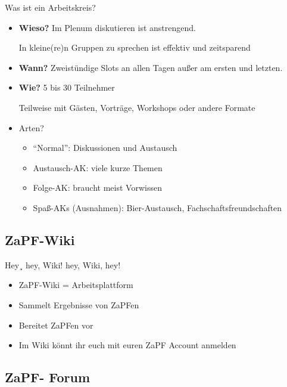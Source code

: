 \documentclass[compress,]{beamer}
\begin{document}
\begin{frame}{Was ist ein Arbeitskreis?}

  \begin{itemize}[<+->]
  \item \textbf{Wieso?} Im Plenum diskutieren ist anstrengend.

    In kleine(re)n Gruppen zu sprechen ist effektiv und zeitsparend
  \item \textbf{Wann?} Zweistündige Slots an allen Tagen außer am ersten und letzten.
  \item \textbf{Wie?} 5 bis 30 Teilnehmer

    Teilweise mit Gästen, Vorträge, Workshops oder andere Formate
  \item Arten?
    \begin{itemize}[<+->]
    \item ``Normal'': Diskussionen und Austausch
    \item Austausch-AK: viele kurze Themen
    \item Folge-AK: braucht meist Vorwissen
    \item Spaß-AKs (Ausnahmen): Bier-Austausch, Fachschaftsfreundschaften
    \end{itemize}
  \end{itemize}

\end{frame}


\subsection{ZaPF-Wiki}

\begin{frame}{Hey¸ hey, Wiki! hey, Wiki, hey!}

\begin{itemize}[<+->]
	\item ZaPF-Wiki = Arbeitsplattform
	\item Sammelt Ergebnisse von ZaPFen
	\item Bereitet ZaPFen vor
	\item Im Wiki könnt ihr euch mit euren ZaPF Account anmelden
\end{itemize}

\end{frame}

\subsection{ZaPF- Forum}
\end{document}
